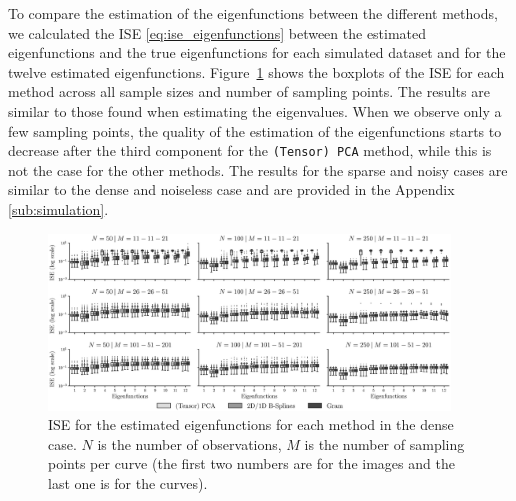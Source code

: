 \begin{results}
To compare the estimation of the eigenfunctions between the different methods, we calculated the ISE \eqref{eq:ise_eigenfunctions} between the estimated eigenfunctions and the true eigenfunctions for each simulated dataset and for the twelve estimated eigenfunctions. Figure~\ref{fig:ise_mfd_1d} shows the boxplots of the ISE for each method across all sample sizes and number of sampling points. The results are similar to those found when estimating the eigenvalues. When we observe only a few sampling points, the quality of the estimation of the eigenfunctions starts to decrease after the third component for the \texttt{(Tensor) PCA} method, while this is not the case for the other methods. The results for the sparse and noisy cases are similar to the dense and noiseless case and are provided in the Appendix \ref{sub:simulation}.
\begin{figure}
     \centering
    \includegraphics[width=0.95\textwidth]{ISE}
    \caption{ISE for the estimated eigenfunctions for each method in the dense case. $N$ is the number of observations, $M$ is the number of sampling points per curve (the first two numbers are for the images and the last one is for the curves).}
    \label{fig:ise_mfd_1d}
\end{figure}
\end{results}

